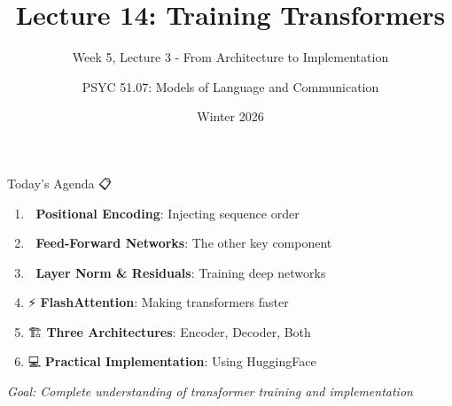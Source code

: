 \documentclass[aspectratio=169]{beamer}
\title{Lecture 14: Training Transformers}
\subtitle{Week 5, Lecture 3 - From Architecture to Implementation}
\author{PSYC 51.07: Models of Language and Communication}
\date{Winter 2026}
\begin{document}
\begin{frame}[shrink=10]
\titlepage
\end{frame}

\begin{frame}[shrink=10]{Today's Agenda 📋}
\large
\begin{enumerate}\setlength{\itemsep}{0pt}
    \item 📍 \textbf{Positional Encoding}: Injecting sequence order
    \item 🔄 \textbf{Feed-Forward Networks}: The other key component
    \item 🔗 \textbf{Layer Norm \& Residuals}: Training deep networks
    \item ⚡ \textbf{FlashAttention}: Making transformers faster
    \item 🏗️ \textbf{Three Architectures}: Encoder, Decoder, Both
    \item 💻 \textbf{Practical Implementation}: Using HuggingFace
\end{enumerate}

\vspace{1em}
\textit{Goal: Complete understanding of transformer training and implementation}
\end{frame}
\end{document}
